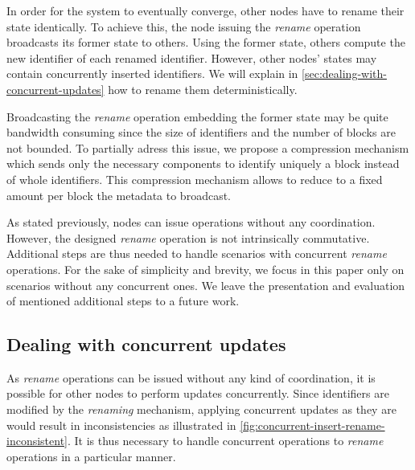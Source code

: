 \documentclass[sigplan,10pt]{acmart}
\begin{document}
In order for the system to eventually converge, other nodes have to rename their state identically.
To achieve this, the node issuing the \emph{rename} operation broadcasts its former state to others.
Using the former state, others compute the new identifier of each renamed identifier.
However, other nodes' states may contain concurrently inserted identifiers.
We will explain in \autoref{sec:dealing-with-concurrent-updates} how to rename them deterministically.

Broadcasting the \emph{rename} operation embedding the former state may be quite bandwidth consuming since the size of identifiers and the number of blocks are not bounded.
To partially adress this issue, we propose a compression mechanism which sends only the necessary components to identify uniquely a block instead of whole identifiers.
This compression mechanism allows to reduce to a fixed amount per block the metadata to broadcast.

As stated previously, nodes can issue operations without any coordination.
However, the designed \emph{rename} operation is not intrinsically commutative.
Additional steps are thus needed to handle scenarios with concurrent \emph{rename} operations.
For the sake of simplicity and brevity, we focus in this paper only on scenarios without any concurrent ones.
We leave the presentation and evaluation of mentioned additional steps to a future work.

\subsection{Dealing with concurrent updates}

\label{sec:dealing-with-concurrent-updates}

As \emph{rename} operations can be issued without any kind of coordination, it is possible for other nodes to perform updates concurrently.
Since identifiers are modified by the \emph{renaming} mechanism, applying concurrent updates as they are would result in inconsistencies as illustrated in \autoref{fig:concurrent-insert-rename-inconsistent}.
It is thus necessary to handle concurrent operations to \emph{rename} operations in a particular manner.
\end{document}

